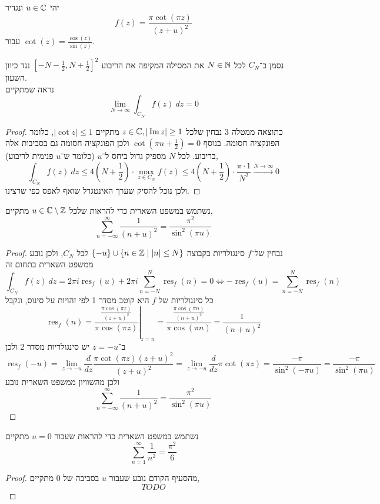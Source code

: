 \question{}
יהי $u \in \mathbb{C}$ ונגדיר
\[
	f(z)
	= \frac{\pi \cot(\pi z)}{{(z + u)}^2}
\]
עבור $\cot(z) = \frac{\cos(z)}{\sin(z)}$.

\subquestion{}
נסמן ב־$C_N$ לכל $N \in \mathbb{N}$ את המסילה המקיפה את הריבוע ${[-N - \frac{1}{2}, N + \frac{1}{2}]}^2$ נגד כיוון השעון. \\
נראה שמתקיים
\[
	\lim_{N \to \infty} \int_{C_N} f(z)\ dz
	= 0
\]
\begin{proof}
	כתוצאה ממטלה 3 נבחין שלכל $z \in \mathbb{C}, |\operatorname{Im} z| \ge 1$ מתקיים $|\cot z| \le 1$, כלומר הפונקציה חסומה.
	בנוסף $\cot(\pi n + \frac{1}{2}) = 0$ ולכן הפונקציה חסומה גם בסביבות אלה בריבוע.
	לכל $N$ מספיק גדול ביחס ל־$u$ (כלומר ש־$u$ פנימית לריבוע),
	\[
		\int_{C_N} f(z)\ dz
		\le 4(N + \frac{1}{2}) \cdot \max_{z \in C_N} f(z)
		\le 4(N + \frac{1}{2}) \cdot \frac{\pi \cdot 1}{N^2}
		\xrightarrow{N \to \infty} 0
	\]
	ולכן נוכל להסיק שערך האינטגרל שואף לאפס כפי שרצינו.
\end{proof}

\subquestion{}
נשתמש במשפט השארית כדי להראות שלכל $u \in \mathbb{C} \setminus \mathbb{Z}$ מתקיים,
\[
	\sum_{n = -\infty}^{\infty} \frac{1}{{(n + u)}^2}
	= \frac{\pi^2}{\sin^2(\pi u)}
\]
\begin{proof}
	נבחין של־$f$ סינגולריות בקבוצה $\{ -u \} \cup \{ n \in \mathbb{Z} \mid |n| \le N \}$ לכל $C_N$, ולכן נובע ממשפט השארית בתחום זה
	\[
		\int_{C_N} f(z)\ dz
		= 2\pi i \operatorname{res}_f(u) + 2\pi i \sum_{n = -N}^{N} \operatorname{res}_f(n)
		= 0
		\iff
		-\operatorname{res}_f(u) = \sum_{n = -N}^{N} \operatorname{res}_f(n)
	\]
	כל סינגולריות של $f$ היא קוטב מסדר 1 לפי זהויות על סינוס, ונקבל
	\[
		\operatorname{res}_f(n)
		= \left. \frac{\frac{\pi \cos(\pi z)}{{(z + u)}^2}}{\pi \cos(\pi z)} \right\rvert_{z = n}
		= \frac{\frac{\pi \cos(\pi n)}{{(n + u)}^2}}{\pi \cos(\pi n)}
		= \frac{1}{{(n + u)}^2}
	\]
	ב־$z = -u$ יש סינגולריות מסדר 2 ולכן
	\[
		\operatorname{res}_f(-u)
		= \lim_{z \to -u} \frac{d}{dz} \frac{\pi \cot(\pi z) {(z + u)}^2}{{(z + u)}^2}
		= \lim_{z \to -u} \frac{d}{dz} \pi \cot(\pi z)
		= \frac{-\pi}{\sin^2(-\pi u)}
		= \frac{-\pi}{\sin^2(\pi u)}
	\]
	ולכן מהשוויון ממשפט השארית נובע
	\[
		\sum_{n = -\infty}^{\infty} \frac{1}{{(n + u)}^2}
		= \frac{\pi^2}{\sin^2(\pi u)}
	\]
\end{proof}

\subquestion{}
נשתמש במשפט השארית כדי להראות שעבור $u = 0$ מתקיים
\[
	\sum_{n = 1}^{\infty} \frac{1}{n^2} = \frac{\pi^2}{6}
\]
\begin{proof}
	מהסעיף הקודם נובע שעבור $u$ בסביבה של $0$ מתקיים,
	\[
		TODO
	\]
\end{proof}

